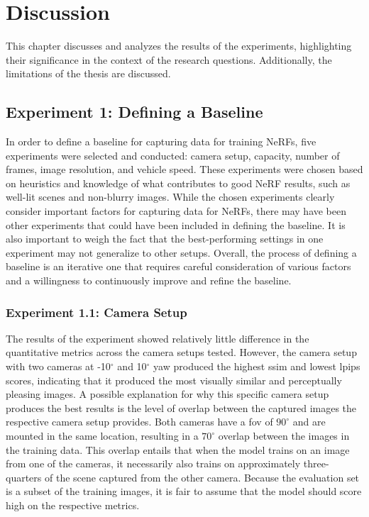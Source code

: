 \chapter{Discussion}
This chapter discusses and analyzes the results of the experiments, highlighting their significance in the context of the research questions. Additionally, the limitations of the thesis are discussed.

\section{Experiment 1: Defining a Baseline}

\begin{comment}
Points to discuss:
- Main point: Discuss the process of choosing which experiments was chosen.
- There might have been other experiments that should've been included in deciding the baseline.
- The way to choose which experiment goes forward could've been done differently.
- Although one experiment seem to do better with the current chosen setup, it might've done worse in another setup.
\end{comment}

In order to define a baseline for capturing data for training NeRFs, five experiments were selected and conducted: camera setup, capacity, number of frames, image resolution, and vehicle speed. These experiments were chosen based on heuristics and knowledge of what contributes to good NeRF results, such as well-lit scenes and non-blurry images. While the chosen experiments clearly consider important factors for capturing data for NeRFs, there may have been other experiments that could have been included in defining the baseline. It is also important to weigh the fact that the best-performing settings in one experiment may not generalize to other setups. Overall, the process of defining a baseline is an iterative one that requires careful consideration of various factors and a willingness to continuously improve and refine the baseline.

\subsection{Experiment 1.1: Camera Setup}
The results of the experiment showed relatively little difference in the quantitative metrics across the camera setups tested. However, the camera setup with two cameras at -10$^{\circ}$ and 10$^{\circ}$ yaw produced the highest \acrshort{ssim} and lowest \acrshort{lpips} scores, indicating that it produced the most visually similar and perceptually pleasing images. A possible explanation for why this specific camera setup produces the best results is the level of overlap between the captured images the respective camera setup provides. Both cameras have a \acrshort{fov} of $90^\circ$ and are mounted in the same location, resulting in a $70^\circ$ overlap between the images in the training data. This overlap entails that when the model trains on an image from one of the cameras, it necessarily also trains on approximately three-quarters of the scene captured from the other camera. Because the evaluation set is a subset of the training images, it is fair to assume that the model should score high on the respective metrics.

